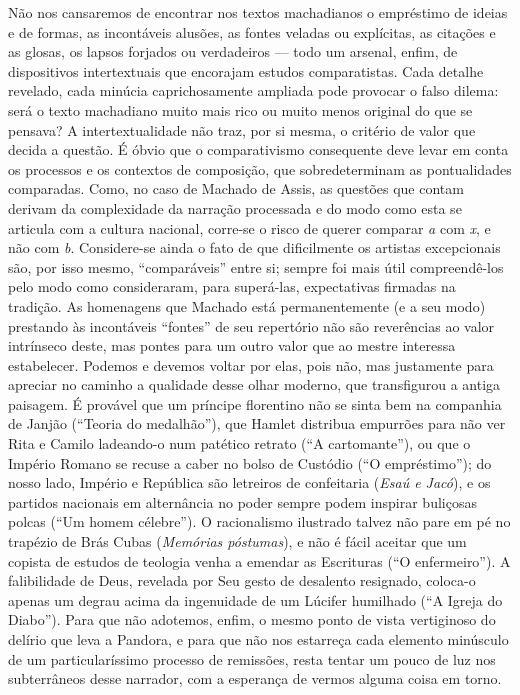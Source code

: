 \noindent{}Não nos cansaremos de encontrar nos textos machadianos o empréstimo de
ideias e de formas, as incontáveis alusões, as fontes veladas ou
explícitas, as citações e as glosas, os lapsos forjados ou verdadeiros
--- todo um arsenal, enfim, de dispositivos intertextuais que encorajam
estudos comparatistas. Cada detalhe revelado, cada minúcia
caprichosamente ampliada pode provocar o falso dilema: será o texto
machadiano muito mais rico ou muito menos original do que se pensava? A
intertextualidade não traz, por si mesma, o critério de valor que decida
a questão. É óbvio que o comparativismo consequente deve levar em conta
os processos e os contextos de composição, que sobredeterminam as
pontualidades comparadas. Como, no caso de Machado de Assis, as questões
que contam derivam da complexidade da narração processada e do modo como
esta se articula com a cultura nacional, corre-se o risco de querer
comparar \emph{a} com \emph{x}, e não com \emph{b}. Considere-se ainda o
fato de que dificilmente os artistas excepcionais são, por isso mesmo,
``comparáveis'' entre si; sempre foi mais útil compreendê-los pelo modo
como consideraram, para superá-las, expectativas firmadas na tradição.
As homenagens que Machado está permanentemente (e a seu modo) prestando
às incontáveis ``fontes'' de seu repertório não são reverências ao valor
intrínseco deste, mas pontes para um outro valor que ao mestre interessa
estabelecer. Podemos e devemos voltar por elas, pois não, mas justamente
para apreciar no caminho a qualidade desse olhar moderno, que
transfigurou a antiga paisagem. É provável que um príncipe florentino
não se sinta bem na companhia de Janjão (``Teoria do medalhão''), que
Hamlet distribua empurrões para não ver Rita e Camilo ladeando-o num
patético retrato (``A cartomante''), ou que o Império Romano se recuse a
caber no bolso de Custódio (``O empréstimo''); do nosso lado, Império e
República são letreiros de confeitaria (\emph{Esaú e Jacó}), e os
partidos nacionais em alternância no poder sempre podem inspirar
buliçosas polcas (``Um homem célebre''). O racionalismo ilustrado talvez
não pare em pé no trapézio de Brás Cubas (\emph{Memórias póstumas}), e
não é fácil aceitar que um copista de estudos de teologia venha a
emendar as Escrituras (``O enfermeiro''). A falibilidade de Deus,
revelada por Seu gesto de desalento resignado, coloca-o apenas um degrau
acima da ingenuidade de um Lúcifer humilhado (``A Igreja do Diabo'').
Para que não adotemos, enfim, o mesmo ponto de vista vertiginoso do
delírio que leva a Pandora, e para que não nos estarreça cada elemento
minúsculo de um particularíssimo processo de remissões, resta tentar um
pouco de luz nos subterrâneos desse narrador, com a esperança de vermos
alguma coisa em torno.

